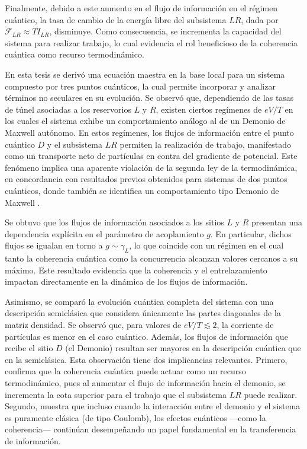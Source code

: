 Finalmente, debido a este aumento en el flujo de información en el régimen cuántico, la tasa de cambio de la energía libre del subsistema $LR$, dada por $\dot{\mathcal{F}}_{LR} \approx T\dot{I}_{LR}$, disminuye. Como consecuencia, se incrementa la capacidad del sistema para realizar trabajo, lo cual evidencia el rol beneficioso de la coherencia cuántica como recurso termodinámico.


\label{sec5:demonio}


En esta tesis se derivó una ecuación maestra en la base local para un sistema compuesto por tres puntos cuánticos, la cual permite incorporar y analizar términos no seculares en su evolución. Se observó que, dependiendo de las tasas de túnel asociadas a los reservorios $L$ y $R$, existen ciertos regímenes de $eV/T$ en los cuales el sistema exhibe un comportamiento análogo al de un Demonio de Maxwell autónomo. En estos regímenes, los flujos de información entre el punto cuántico $D$ y el subsistema $LR$ permiten la realización de trabajo, manifestado como un transporte neto de partículas en contra del gradiente de potencial. Este fenómeno implica una aparente violación de la segunda ley de la termodinámica, en concordancia con resultados previos obtenidos para sistemas de dos puntos cuánticos, donde también se identifica un comportamiento tipo Demonio de Maxwell \cite{horowitz2014thermodynamics}.

Se obtuvo que los flujos de información asociados a los sitios $L$ y $R$ presentan una dependencia explícita en el parámetro de acoplamiento $g$. En particular, dichos flujos se igualan en torno a $g \sim \gamma_L$, lo que coincide con un régimen en el cual tanto la coherencia cuántica como la concurrencia alcanzan valores cercanos a su máximo. Este resultado evidencia que la coherencia y el entrelazamiento impactan directamente en la dinámica de los flujos de información.

Asimismo, se comparó la evolución cuántica completa del sistema con una descripción semiclásica que considera únicamente las partes diagonales de la matriz densidad. Se observó que, para valores de $eV/T \lesssim 2$, la corriente de partículas es menor en el caso cuántico. Además, los flujos de información que recibe el sitio $D$ (el Demonio) resultan ser mayores en la descripción cuántica que en la semiclásica. Esta observación tiene dos implicancias relevantes. Primero, confirma que la coherencia cuántica puede actuar como un recurso termodinámico, pues al aumentar el flujo de información hacia el demonio, se incrementa la cota superior para el trabajo que el subsistema $LR$ puede realizar. Segundo, muestra que incluso cuando la interacción entre el demonio y el sistema es puramente clásica (de tipo Coulomb), los efectos cuánticos —como la coherencia— continúan desempeñando un papel fundamental en la transferencia de información.

